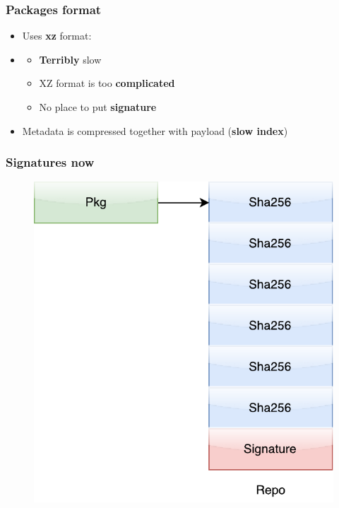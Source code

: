 \documentclass{beamer}
\begin{document}
\begin{frame}
\frametitle{Packages format}
\begin{itemize}
\item Uses \textbf{xz} format:
\item<2->\begin{itemize}
\item<2-> \textbf{Terribly} slow
\item<2-> XZ format is too \textbf{complicated}
\item<2-> No place to put \textbf{signature}
\end{itemize}
\item<3-> Metadata is compressed together with  payload (\textbf{slow index})
\end{itemize}
\end{frame}

\begin{frame}[fragile]
\frametitle{Signatures now}
\begin{figure}[h!]
  \centering
  \includegraphics[height=0.7\textheight]{pkg_repo_signature.pdf}
\end{figure}
\end{frame}
\end{document}
